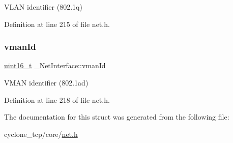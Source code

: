 V\+L\+AN identifier (802.\+1q) 



Definition at line 215 of file net.\+h.

\mbox{\label{struct__NetInterface_abed68dc5c574c089cffc3d1906928ea1}} 
\subsubsection{\texorpdfstring{vman\+Id}{vmanId}}
{\footnotesize\ttfamily \hyperlink{stdint_8h_a273cf69d639a59973b6019625df33e30}{uint16\+\_\+t} \+\_\+\+Net\+Interface\+::vman\+Id}



V\+M\+AN identifier (802.\+1ad) 



Definition at line 218 of file net.\+h.



The documentation for this struct was generated from the following file\+:\begin{DoxyCompactItemize}
\item 
cyclone\+\_\+tcp/core/\hyperlink{net_8h}{net.\+h}\end{DoxyCompactItemize}
